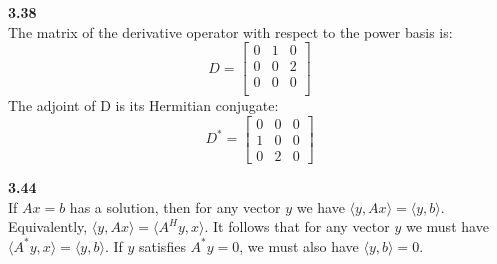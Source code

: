\documentclass[letterpaper,12pt]{article}
\theoremstyle{definition}
\begin{document}
\noindent\textbf{3.38}\\
The matrix of the derivative operator with respect to the power basis is:
\begin{equation*}
D=\begin{bmatrix}
0 & 1 & 0\\
0 & 0 & 2\\
0 & 0 & 0\\
\end{bmatrix}
\end{equation*}
The adjoint of D is its Hermitian conjugate:
\begin{equation*}
D^*=\begin{bmatrix}
0 & 0 & 0\\
1 & 0 & 0\\
0 & 2 & 0
\end{bmatrix}
\end{equation*}

\noindent\textbf{3.44}\\
If $Ax = b$ has a solution, then for any vector $y$ we have $\langle y, Ax \rangle = \langle y, b \rangle$. Equivalently, $\langle y, Ax \rangle = \langle A^Hy, x \rangle$. It follows that for any vector $y$ we must have $\langle A^*y, x \rangle = \langle y, b \rangle$. If $y$ satisfies $A^*y = 0$, we must also have $\langle y, b \rangle = 0$.
\end{document}
